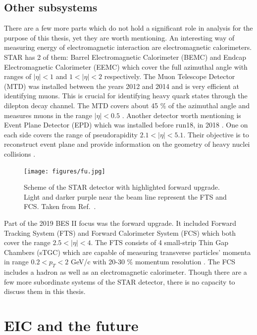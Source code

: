 \subsection{Other subsystems}
There are a few more parts which do not hold a significant role in analysis for the purpose of this thesis, yet they are worth mentioning. An interesting way of measuring energy of electromagnetic interaction are electromagnetic calorimeters. STAR has 2 of them: Barrel Electromagnetic Calorimeter\cite{BEMC} (BEMC) and Endcap Electromagnetic Calorimeter\cite{EEMC} (EEMC) which cover the full azimuthal angle with ranges of $|\eta|<1$ and $1<|\eta|<2$ respectively. The Muon Telescope Detector (MTD) was installed between the years 2012 and 2014 and is very efficient at identifying muons. This is crucial for identifying heavy quark states through the dilepton decay channel. The MTD covers about 45 $\%$ of the azimuthal angle and measures muons in the range $|\eta|<0.5$ \cite{MTD}. Another detector worth mentioning is Event Plane Detector (EPD) which was installed before run18, in 2018 \cite{BESII}. One on each side covers the range of pseudorapidity $2.1<|\eta|<5.1$. Their objective is to reconstruct event plane and provide information on the geometry of heavy nuclei collisions \cite{EPD}.

\FloatBarrier
\begin{figure}[ht]
    \centering
    \texttt{[image: figures/fu.jpg]}
    \caption[Schematic view of the STAR detector with highlighted forward upgrade BES II]{Scheme of the STAR detector with highlighted forward upgrade. Light and darker purple near the beam line represent the FTS and FCS. Taken from Ref.~\cite{BNL}.}
    \label{df10}
\end{figure}
\FloatBarrier

Part of the 2019 BES II focus was the forward upgrade. It included Forward Tracking System (FTS) and Forward Calorimeter System (FCS) which both cover the range $2.5<|\eta|<4$. The FTS consists of 4 small-strip Thin Gap Chambers (sTGC) which are capable of measuring transverse particles' momenta in range $0.2<p_T<2$ GeV/c with 20-30 $\%$ momentum resolution \cite{BESII}. The FCS includes a hadron as well as an electromagnetic calorimeter. Though there are a few more subordinate systems of the STAR detector, there is no capacity to discuss them in this thesis.

\section{EIC and the future}
\label{EIC}


